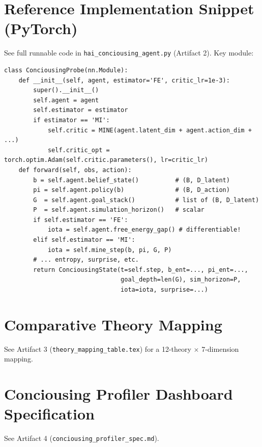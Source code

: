 \documentclass[11pt,a4paper]{article}
\begin{document}
\section{Reference Implementation Snippet (PyTorch)}
\label{sec:impl}

See full runnable code in \texttt{hai\_conciousing\_agent.py} (Artifact 2). Key module:

\begin{verbatim}
class ConciousingProbe(nn.Module):
    def __init__(self, agent, estimator='FE', critic_lr=1e-3):
        super().__init__()
        self.agent = agent
        self.estimator = estimator
        if estimator == 'MI':
            self.critic = MINE(agent.latent_dim + agent.action_dim + ...)
            self.critic_opt = torch.optim.Adam(self.critic.parameters(), lr=critic_lr)
    def forward(self, obs, action):
        b = self.agent.belief_state()          # (B, D_latent)
        pi = self.agent.policy(b)              # (B, D_action)
        G  = self.agent.goal_stack()           # list of (B, D_latent)
        P  = self.agent.simulation_horizon()   # scalar
        if self.estimator == 'FE':
            iota = self.agent.free_energy_gap() # differentiable!
        elif self.estimator == 'MI':
            iota = self.mine_step(b, pi, G, P)
        # ... entropy, surprise, etc.
        return ConciousingState(t=self.step, b_ent=..., pi_ent=..., 
                                goal_depth=len(G), sim_horizon=P, 
                                iota=iota, surprise=...)
\end{verbatim}

\section{Comparative Theory Mapping}
\label{sec:mapping}
See Artifact 3 (\texttt{theory_mapping_table.tex}) for a 12-theory $\times$ 7-dimension mapping.

\section{Conciousing Profiler Dashboard Specification}
\label{sec:dashboard}
See Artifact 4 (\texttt{conciousing_profiler_spec.md}).

\printbibliography

\end{document}
